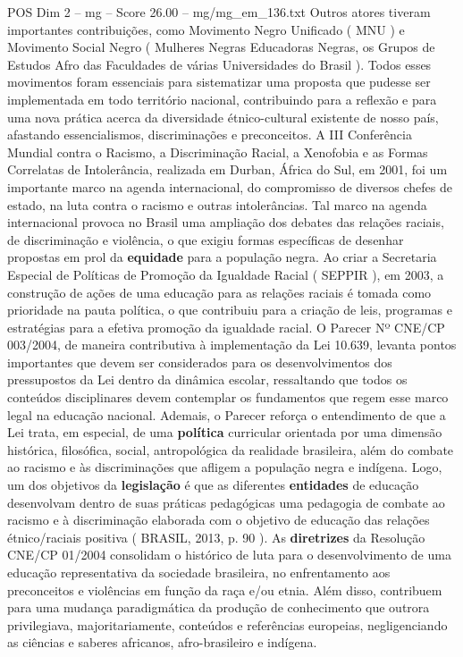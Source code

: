 \begin{textsample}{POS Dim 2 – mg – Score 26.00 – mg/mg\_em\_136.txt}
Outros atores tiveram importantes contribuições, como Movimento Negro Unificado ( MNU ) e Movimento Social Negro ( Mulheres Negras Educadoras Negras, os Grupos de Estudos Afro das Faculdades de várias Universidades do Brasil ).
Todos esses movimentos foram essenciais para sistematizar uma proposta que pudesse ser implementada em todo território nacional, contribuindo para a reflexão e para uma nova prática acerca da diversidade étnico-cultural existente de nosso país, afastando essencialismos, discriminações e preconceitos.
A III Conferência Mundial contra o Racismo, a Discriminação Racial, a Xenofobia e as Formas Correlatas de Intolerância, realizada em Durban, África do Sul, em 2001, foi um importante marco na agenda internacional, do compromisso de diversos chefes de estado, na luta contra o racismo e outras intolerâncias.
Tal marco na agenda internacional provoca no Brasil uma ampliação dos debates das relações raciais, de discriminação e violência, o que exigiu formas específicas de desenhar propostas em prol da \textbf{equidade} para a população negra.
Ao criar a Secretaria Especial de Políticas de Promoção da Igualdade Racial ( SEPPIR ), em 2003, a construção de ações de uma educação para as relações raciais é tomada como prioridade na pauta política, o que contribuiu para a criação de leis, programas e estratégias para a efetiva promoção da igualdade racial.
O Parecer Nº CNE/CP 003/2004, de maneira contributiva à implementação da Lei 10.639, levanta pontos importantes que devem ser considerados para os desenvolvimentos dos pressupostos da Lei dentro da dinâmica escolar, ressaltando que todos os conteúdos disciplinares devem contemplar os fundamentos que regem esse marco legal na educação nacional.
Ademais, o Parecer reforça o entendimento de que a Lei trata, em especial, de uma \textbf{política} curricular orientada por uma dimensão histórica, filosófica, social, antropológica da realidade brasileira, além do combate ao racismo e às discriminações que afligem a população negra e indígena.
Logo, um dos objetivos da \textbf{legislação} é que as diferentes \textbf{entidades} de educação desenvolvam dentro de suas práticas pedagógicas uma pedagogia de combate ao racismo e à discriminação elaborada com o objetivo de educação das relações étnico/raciais positiva ( BRASIL, 2013, p. 90 ).
As \textbf{diretrizes} da Resolução CNE/CP 01/2004 consolidam o histórico de luta para o desenvolvimento de uma educação representativa da sociedade brasileira, no enfrentamento aos preconceitos e violências em função da raça e/ou etnia.
Além disso, contribuem para uma mudança paradigmática da produção de conhecimento que outrora privilegiava, majoritariamente, conteúdos e referências europeias, negligenciando as ciências e saberes africanos, afro-brasileiro e indígena.

\end{textsample}
